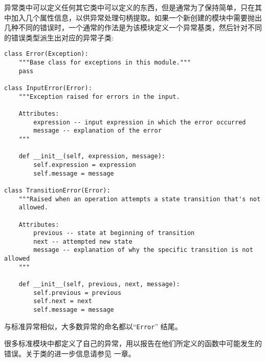 异常类中可以定义任何其它类中可以定义的东西，但是通常为了保持简单，只在其中加入几个属性信息，以供异常处理句柄提取。如果一个新创建的模块中需要抛出几种不同的错误时，一个通常的作法是为该模块定义一个异常基类，然后针对不同的错误类型派生出对应的异常子类:
\begin{lstlisting}
class Error(Exception):
    """Base class for exceptions in this module."""
    pass

class InputError(Error):
    """Exception raised for errors in the input.

    Attributes:
        expression -- input expression in which the error occurred
        message -- explanation of the error
    """

    def __init__(self, expression, message):
        self.expression = expression
        self.message = message

class TransitionError(Error):
    """Raised when an operation attempts a state transition that's not
    allowed.

    Attributes:
        previous -- state at beginning of transition
        next -- attempted new state
        message -- explanation of why the specific transition is not allowed
    """

    def __init__(self, previous, next, message):
        self.previous = previous
        self.next = next
        self.message = message
\end{lstlisting}
与标准异常相似，大多数异常的命名都以“\texttt{Error}” 结尾。

很多标准模块中都定义了自己的异常，用以报告在他们所定义的函数中可能发生的错误。关于类的进一步信息请参见  一章。
